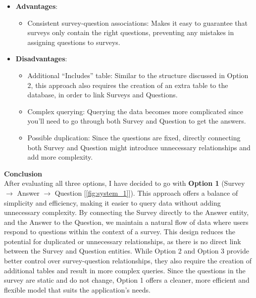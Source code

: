 \begin{itemize}
    \item \textbf{Advantages}:
    \begin{itemize}
        \item Consistent survey-question associations: Makes it easy to guarantee that surveys only contain the right questions, preventing any mistakes in assigning questions to surveys.
    \end{itemize}
    \item \textbf{Disadvantages}:
    \begin{itemize}
        \item Additional ``Includes'' table: Similar to the structure discussed in Option 2, this approach also requires the creation of an extra table to the database, in order to link Surveys and Questions.
        \item Complex querying: Querying the data becomes more complicated since you’ll need to go through both Survey and Question to get the answers.
        \item Possible duplication: Since the questions are fixed, directly connecting both Survey and Question might introduce unnecessary relationships and add more complexity.
    \end{itemize}
\end{itemize}

\vspace{5mm}

\noindent \textbf{Conclusion} \\
After evaluating all three options, I have decided to go with \textbf{Option 1} (Survey $\rightarrow$ Answer $\rightarrow$ Question [\ref{fig:system_1}]). This approach offers a balance of simplicity and efficiency, making it easier to query data without adding unnecessary complexity. By connecting the Survey directly to the Answer entity, and the Answer to the Question, we maintain a natural flow of data where users respond to questions within the context of a survey. This design reduces the potential for duplicated or unnecessary relationships, as there is no direct link between the Survey and Question entities. While Option 2 and Option 3 provide better control over survey-question relationships, they also require the creation of additional tables and result in more complex queries. Since the questions in the survey are static and do not change, Option 1 offers a cleaner, more efficient and flexible model that suits the application's needs.

\vspace{5mm}

